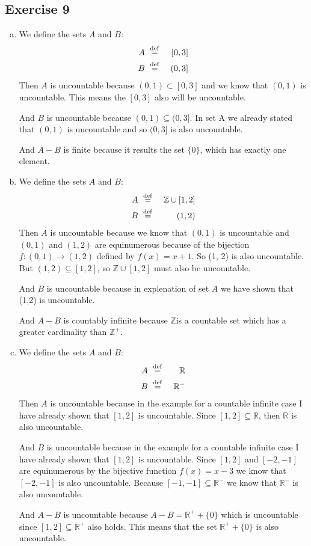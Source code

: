 \documentclass[a4paper]{article}
\newcommand{\exerciseenum}[2]{\subsection*{Exercise #1}{\begin{enumerate}[a)]#2\end{enumerate}}}
\newcommand{\ZZ}{\ensuremath{\mathbb{Z}}}
\newcommand{\ZZp}{\ensuremath{\mathbb{Z}^{+}}}
\newcommand{\RR}{\ensuremath{\mathbb{R}}}
\newcommand{\RRp}{\ensuremath{\mathbb{R}^{+}}}
\newcommand{\isdef}{\ensuremath{\,\,\buildrel\rm def\over=}\,\,}
\begin{document}
\exerciseenum{9}{%
\item%
We define the sets $A$ and $B$:
\begin{eqnarray*}
A &\isdef& [0, 3] \\
B &\isdef& (0, 3]
\end{eqnarray*}
Then $A$ is uncountable because $(0, 1) \subset [0,3]$ and we know that $(0,1)$ is uncountable. This means the $[0, 3]$ also will be uncountable.

\smallskip
And $B$ is uncountable because $(0, 1) \subseteq (0, 3]$. In set A we already stated that $(0,1)$ is uncountable and so $(0,3]$ is also uncountable.

\smallskip
And $A-B$ is finite because it results the set $\{0\}$, which has exactly one element.

\item%
We define the sets $A$ and $B$:
\begin{eqnarray*}
A &\isdef& \ZZ \cup [1, 2] \\
B &\isdef& (1, 2)
\end{eqnarray*}
Then $A$ is uncountable because we know that $(0, 1)$ is uncountable and
$(0, 1)$ and $(1, 2)$ are equinumerous because of the bijection
$f:(0, 1) \rightarrow (1, 2)$ defined by $f(x) = x + 1$. So (1, 2) is also
uncountable. But $(1, 2) \subseteq [1, 2]$, so $\ZZ \cup [1, 2]$ must also be uncountable.

\smallskip
And $B$ is uncountable because in explenation of set $A$ we have shown that (1,2) is uncountable.

\smallskip
And $A-B$ is countably infinite because \ZZ \enspace is a countable set which has a greater cardinality than \ZZp.

\item%
We define the sets $A$ and $B$:
\begin{eqnarray*}
A &\isdef& \RR \\
B &\isdef& \RR^-
\end{eqnarray*}
Then $A$ is uncountable because in the example for a countable infinite case I have already shown that $[1, 2]$ is uncountable. Since $[1, 2] \subseteq \RR$, then $\RR$ is also uncountable.

\smallskip
And $B$ is uncountable because in the example for a countable infinite case I have already shown that $[1, 2]$ is uncountable. Since $[1, 2]$ and $[-2, -1]$ are equinumerous by the bijective function $f(x) = x - 3$ we know that $[-2, -1]$ is also uncountable.  Because $[-1, -1] \subseteq \RR^-$ we know that $\RR^-$ is also uncountable.

\smallskip
And $A-B$ is uncountable because $A - B = \RRp + \{0\}$ which is uncountable since $[1, 2] \subseteq \RRp$ also holds. This means that the set $\RRp + \{0\}$ is also uncountable.
}
\end{document}
